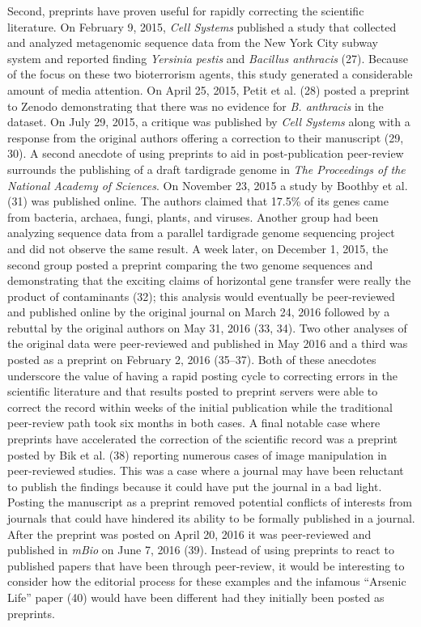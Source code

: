 \documentclass[11,]{article}
\begin{document}
Second, preprints have proven useful for rapidly correcting the
scientific literature. On February 9, 2015, \emph{Cell Systems}
published a study that collected and analyzed metagenomic sequence data
from the New York City subway system and reported finding \emph{Yersinia
pestis} and \emph{Bacillus anthracis} (27). Because of the focus on
these two bioterrorism agents, this study generated a considerable
amount of media attention. On April 25, 2015, Petit et al. (28) posted a
preprint to Zenodo demonstrating that there was no evidence for \emph{B.
anthracis} in the dataset. On July 29, 2015, a critique was published by
\emph{Cell Systems} along with a response from the original authors
offering a correction to their manuscript (29, 30). A second anecdote of
using preprints to aid in post-publication peer-review surrounds the
publishing of a draft tardigrade genome in \emph{The Proceedings of the
National Academy of Sciences}. On November 23, 2015 a study by Boothby
et al. (31) was published online. The authors claimed that 17.5\% of its
genes came from bacteria, archaea, fungi, plants, and viruses. Another
group had been analyzing sequence data from a parallel tardigrade genome
sequencing project and did not observe the same result. A week later, on
December 1, 2015, the second group posted a preprint comparing the two
genome sequences and demonstrating that the exciting claims of
horizontal gene transfer were really the product of contaminants (32);
this analysis would eventually be peer-reviewed and published online by
the original journal on March 24, 2016 followed by a rebuttal by the
original authors on May 31, 2016 (33, 34). Two other analyses of the
original data were peer-reviewed and published in May 2016 and a third
was posted as a preprint on February 2, 2016 (35--37). Both of these
anecdotes underscore the value of having a rapid posting cycle to
correcting errors in the scientific literature and that results posted
to preprint servers were able to correct the record within weeks of the
initial publication while the traditional peer-review path took six
months in both cases. A final notable case where preprints have
accelerated the correction of the scientific record was a preprint
posted by Bik et al. (38) reporting numerous cases of image manipulation
in peer-reviewed studies. This was a case where a journal may have been
reluctant to publish the findings because it could have put the journal
in a bad light. Posting the manuscript as a preprint removed potential
conflicts of interests from journals that could have hindered its
ability to be formally published in a journal. After the preprint was
posted on April 20, 2016 it was peer-reviewed and published in
\emph{mBio} on June 7, 2016 (39). Instead of using preprints to react to
published papers that have been through peer-review, it would be
interesting to consider how the editorial process for these examples and
the infamous ``Arsenic Life'' paper (40) would have been different had
they initially been posted as preprints.
\end{document}
